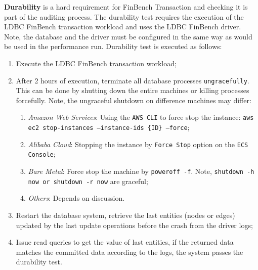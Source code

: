 {\bf Durability} is a hard requirement for FinBench Transaction and checking it 
is part of the auditing process. The durability test requires the execution of 
the LDBC FinBench transaction workload and uses the LDBC FinBench driver. Note, 
the database and the driver must be configured in the same way as would be used 
in the performance run. Durability test is executed as follows:

\begin{enumerate}[label={(\roman*)}]
  \item Execute the LDBC FinBench transaction workload;
  \item After 2 hours of execution, terminate all database processes 
        \texttt{ungracefully}. This can be done by shutting down the entire 
        machines or killing processes forcefully. Note, the ungraceful shutdown
        on difference machines may differ:
        \begin{enumerate}[label={(\alph*)}]
          \item \emph{Amazon Web Services}: Using the \texttt{AWS CLI} to force 
                stop the instance: 
                \texttt{aws ec2 stop-instances --instance-ids \{ID\} --force};
          \item \emph{Alibaba Cloud}: Stopping the instance by \texttt{Force Stop}
                option on the \texttt{ECS Console};
          \item \emph{Bare Metal}: Force stop the machine by \texttt{poweroff -f}.
                Note, \texttt{shutdown -h now or shutdown -r now} are graceful;
          \item \emph{Others}: Depends on discussion.
        \end{enumerate}
  \item Restart the database system, retrieve the last entities (nodes or edges)
        updated by the last update operations before the crash from the driver 
        logs;
  \item Issue read queries to get the value of last entities, if the returned 
        data matches the committed data according to the logs, the system
        passes the durability test.
\end{enumerate}

